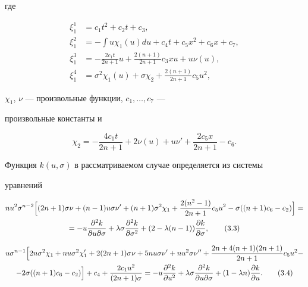 где


\begin{equation}


\begin{split}


\xi^1_1&=c_1t^2+c_2t+c_3,\\


\xi^2_1&=-\int u\chi_1(u)du+c_4t+c_5x^2+c_6x+c_7,\\


\xi^3_1&=-\frac{2c_1t}{2n+1}u+\frac{2(n+1)}{2n+1}c_3xu+u\nu(u),\\


\xi^4_1&=\sigma^2\chi_1(u)+\sigma\chi_2+\frac{2(n+1)}{2n+1}c_5u^2,


\end{split}


\tag{3.2}


\end{equation}


$\chi_1$, $\nu$ --- произвольные функции, $c_1,\dotsc,c_7$ ---


произвольные константы и


$$


\chi_2=-\frac{4c_1t}{2n+1}+2\nu(u)+u\nu'+


\frac{2c_5x}{2n+1}-c_6.


$$


Функция $k(u,\sigma)$ в рассматриваемом случае определяется из системы


уравнений


\begin{multline}


nu^2\sigma^{n-2}\Bigl[(2n+1)\sigma\nu+(n-1)u\sigma\nu'+(n+1)


\sigma^2\chi_1+\frac{2(n^2-1)}{2n+1}c_5u^2-


\sigma((n+1)c_6-c_2)\Bigr]=\\


=-u\frac{\pa^2k}{\pa u\pa\sigma}+\lambda\sigma


\frac{\pa^2k}{\pa\sigma^2}+(2-\lambda(n-1))


\frac{\pa k}{\pa\sigma},


\tag{3.3}


\end{multline}


\begin{multline}


u\sigma^{n-1}\Bigl[2n\sigma^2\chi_1+nu\sigma^2\chi_1'+


2(2n+1)\sigma\nu+5nu\sigma\nu'+nu^2\sigma\nu''+


\frac{2n+4(n+1)(2n+1)}{2n+1}c_5u^2-\\


-2\sigma((n+1)c_6-c_2)\Bigr]+c_4+


\frac{2c_1u^2}{(2n+1)\sigma}=-u\frac{\pa^2k}{\pa u^2}+


\lambda\sigma\frac{\pa^2k}{\pa u\pa\sigma}+(1-\lambda n)


\frac{\pa k}{\pa u}.


\tag{3.4}


\end{multline}


